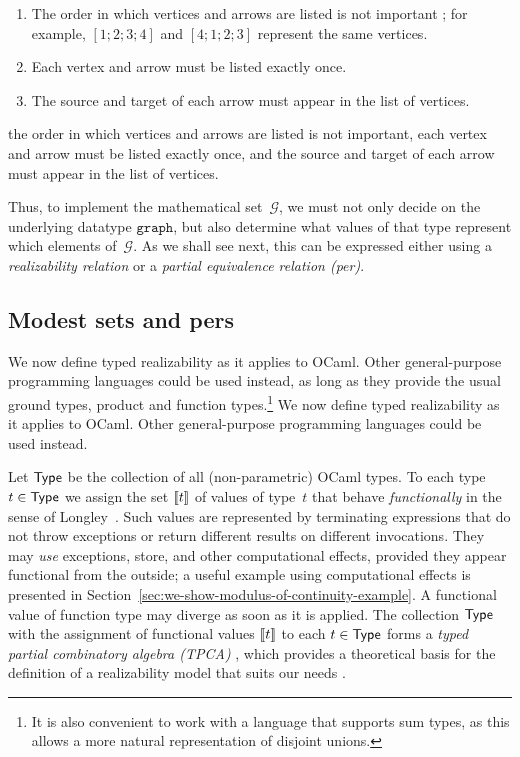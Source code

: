 %
\iflong
\begin{enumerate}
\item The order in which vertices and arrows are listed is not
  important%
; for example, $[1;2;3;4]$ and $[4;1;2;3]$ represent the same vertices.
\item Each vertex and arrow must be listed exactly once.
\item The source and target of each arrow must appear in the list of vertices.
\end{enumerate}
\else %
the order in which vertices and arrows are listed is not
important, each vertex and arrow must be listed exactly once, and
the source and target of each arrow must appear in the list of vertices.
\fi %

%
Thus, to implement the mathematical set~$\mathcal{G}$, we must not
only decide on the underlying datatype $\mathtt{graph}$, but also
determine what values of that type represent which elements
of~$\mathcal{G}$. As we shall see next, this can be expressed either
using a \emph{realizability relation} or a \emph{partial equivalence
  relation (per)}.


\subsection{Modest sets and pers}
\label{sec:modest-sets-pers}

\iflong
We now define typed realizability as it
applies to OCaml. Other general-purpose programming languages could be
used instead, as long as they provide the usual ground types, product
and function types.\footnote{It is also convenient to work with a
language that supports sum types, as this allows a more natural
representation of disjoint unions.}
\else
We now define typed realizability as it
applies to OCaml. Other general-purpose programming languages could be
used instead.
\fi %

Let $\mathsf{Type}$ be the collection of all (non-parametric) OCaml types. To
each type $t \in \mathsf{Type}$ we assign the set $[\![t]\!]$ of values of
type~$t$ that behave \emph{functionally} in the sense of
Longley~\cite{longley99when}. Such values are represented by
terminating expressions that do not throw exceptions or return
different results on different invocations. They may \emph{use}
exceptions, store, and other computational effects, provided they
appear functional from the outside; a useful example using
computational effects is presented in
Section~\ref{sec:we-show-modulus-of-continuity-example}. A functional
value of function type may diverge as soon as it is applied. The
collection $\mathsf{Type}$ with the assignment of functional values
$[\![t]\!]$ to each $t \in \mathsf{Type}$ forms a \emph{typed partial
  combinatory algebra (TPCA)}%
\iflong
, which provides a theoretical basis for
the definition of a realizability model that suits our needs%
\fi%
.

